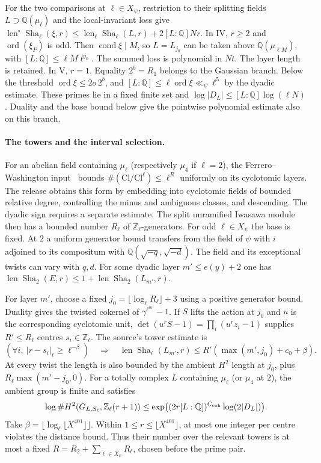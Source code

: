 \documentclass[letterpaper,11pt]{article}
\newcommand{\QQ}{\mathbb Q}
\newcommand{\ZZ}{\mathbb Z}
\newcommand{\Sha}{\operatorname{Sha}}
\newcommand{\len}{\operatorname{len}}
\newcommand{\ord}{\operatorname{ord}}
\begin{document}
For the two comparisons at \(\ell\in X_\psi\), restriction to their splitting fields \(L\supset\QQ(\mu_\ell)\) and the local-invariant loss give
\(\len^\circ\Sha_\ell(\xi,r)\le\len_\ell\Sha_\ell(L,r)+2[L:\QQ]Nr\).
In IV, \(r\ge2\) and \(\ord(\xi_P)\) is odd. Then \(\operatorname{cond}\xi\mid M\), so \(L=L_{j_0}\) can be taken above \(\QQ(\mu_{\ell M})\), with \([L:\QQ]\le\ell M\ell^{j_0}\). The summed loss is polynomial in \(Nt\). The layer length is retained. In V, \(r=1\). Equality \(2^b=R_1\) belongs to the Gaussian branch. Below the threshold \(\ord\xi\le2o\,2^b\), and \([L:\QQ]\le\ell\ord\xi\ll_\psi\ell^5\) by the dyadic estimate. These primes lie in a fixed finite set and \(\log|D_L|\le[L:\QQ]\log(\ell N)\). Duality and the base bound below give the pointwise polynomial estimate also on this branch.

\paragraph{The towers and the interval selection.}
For an abelian field containing \(\mu_\ell\) (respectively \(\mu_4\) if \(\ell=2\)), the Ferrero--Washington input~\cite{fw} bounds \(\#(\mathrm{Cl}/\mathrm{Cl}^\ell)\le\ell^{R}\) uniformly on its cyclotomic layers. The release obtains this form by embedding into cyclotomic fields of bounded relative degree, controlling the minus and ambiguous classes, and descending. The dyadic sign requires a separate estimate. The split unramified Iwasawa module then has a bounded number \(R_\ell\) of \(\ZZ_\ell\)-generators. For odd \(\ell\in X_\psi\) the base is fixed. At \(2\) a uniform generator bound transfers from the field of \(\psi\) with \(i\) adjoined to its compositum with \(\QQ(\sqrt{-q},\sqrt{-d})\). The field and its exceptional twists can vary with \(q,d\). For some dyadic layer \(m'\le e(y)+2\) one has \(\len\Sha_2(E,r)\le1+\len\Sha_2(L_{m'},r)\).

For layer \(m'\), choose a fixed \(j_0=\lfloor\log_\ell R_\ell\rfloor+3\) using a positive generator bound. Duality gives the twisted cokernel of \(\gamma^{\ell^{m'}}-1\). If \(S\) lifts the action at \(j_0\) and \(u\) is the corresponding cyclotomic unit, \(\det(u^r S-1)=\prod_i(u^rz_i-1)\) supplies \(R'\le R_\ell\) centres \(s_i\in\ZZ_\ell\). The source's tower estimate is
\[
 (\forall i,\ |r-s_i|_\ell\ge\ell^{-\beta})\quad\Longrightarrow\quad
 \len\Sha_\ell(L_{m'},r)\le R'(\max(m',j_0)+c_0+\beta).
\]
At every twist the length is also bounded by the ambient \(H^2\) length at \(j_0\), plus \(R_\ell\max(m'-j_0,0)\). For a totally complex \(L\) containing \(\mu_\ell\) (or \(\mu_4\) at \(2\)), the ambient group is finite and satisfies
\[
 \log\#H^2(G_{L,S_\ell},\ZZ_\ell(r+1))
 \le\exp\!\big((2r[L:\QQ])^{C_{\rm coh}}\log(2|D_L|)\big).
\]
Take \(\beta=\lfloor\log_\ell\lfloor X^{401}\rfloor\rfloor\). Within \(1\le r\le\lfloor X^{401}\rfloor\), at most one integer per centre violates the distance bound. Thus their number over the relevant towers is at most a fixed \(R=R_2+\sum_{\ell\in X_\psi}R_\ell\), chosen before the prime pair.
\end{document}
